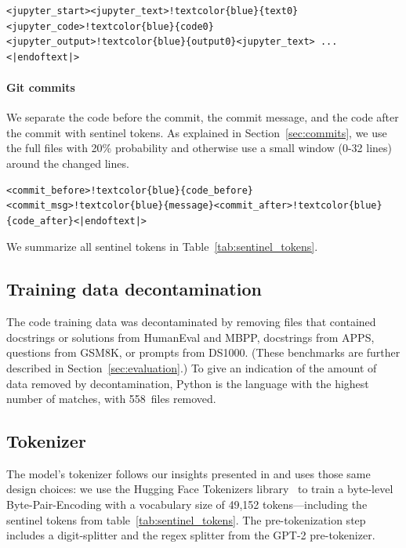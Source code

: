 \begin{Verbatim}[commandchars=!\{\}]
<jupyter_start><jupyter_text>!textcolor{blue}{text0}<jupyter_code>!textcolor{blue}{code0}
<jupyter_output>!textcolor{blue}{output0}<jupyter_text> ... <|endoftext|> 
\end{Verbatim}

\paragraph{Git commits} We separate the code before the commit, the commit message, and the code after the commit with sentinel tokens. As explained in Section~\ref{sec:commits}, we use the full files with 20\% probability and otherwise use a small window (0-32 lines) around the changed lines.

\begin{Verbatim}[commandchars=!\{\}]
<commit_before>!textcolor{blue}{code_before}<commit_msg>!textcolor{blue}{message}<commit_after>!textcolor{blue}{code_after}<|endoftext|>
\end{Verbatim}

We summarize all sentinel tokens in Table~\ref{tab:sentinel_tokens}. 

\subsection{Training data decontamination}\label{sec:decontamination}

The code training data was decontaminated by removing files that contained docstrings or solutions from HumanEval and MBPP, docstrings from APPS, questions from GSM8K, or prompts from DS1000. (These benchmarks are further described in Section~\ref{sec:evaluation}.)
To give an indication of the amount of data removed by decontamination, Python is the language with the highest number of matches, with 558~files removed.

\subsection{Tokenizer}\label{sec:tokenizer}
The model's tokenizer follows our insights presented in \citet{allal2023santacoder} and uses those same design choices: we use the Hugging Face Tokenizers library~\citep{anthony_moi_2022_hftokenizers} to train a byte-level Byte-Pair-Encoding with a vocabulary size of 49,152 tokens---including the sentinel tokens from table~\ref{tab:sentinel_tokens}. The pre-tokenization step includes a digit-splitter and the regex splitter from the GPT-2 pre-tokenizer.

